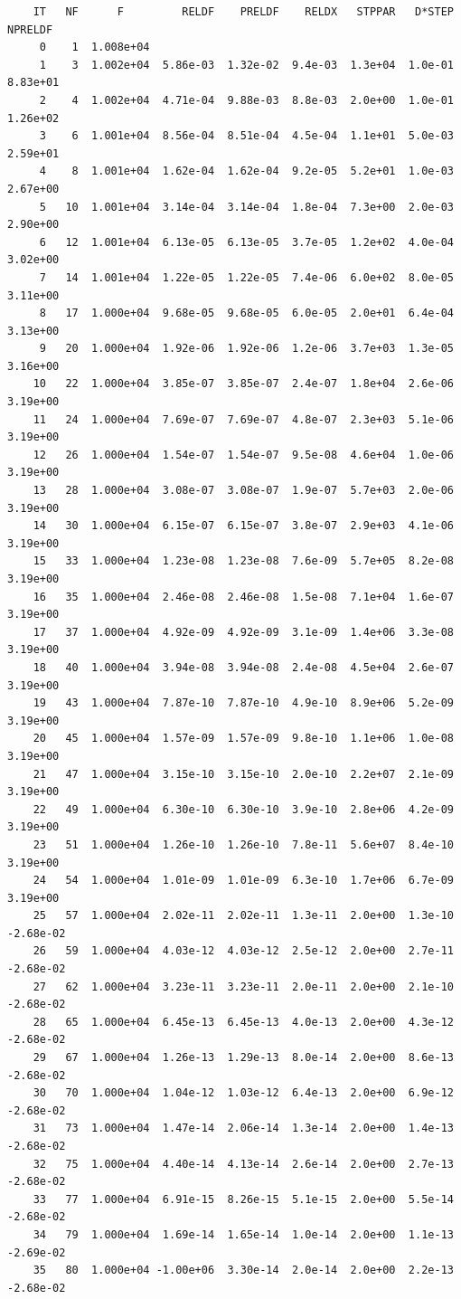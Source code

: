 \documentclass[11pt]{article}\usepackage[]{graphicx}\usepackage[]{color}
\makeatletter
\newenvironment{kframe}{%
 \def\at@end@of@kframe{}%
 \ifinner\ifhmode%
  \def\at@end@of@kframe{\end{minipage}}%
  \begin{minipage}{\columnwidth}%
 \fi\fi%
 \def\FrameCommand##1{\hskip\@totalleftmargin \hskip-\fboxsep
 \colorbox{shadecolor}{##1}\hskip-\fboxsep
     \hskip-\linewidth \hskip-\@totalleftmargin \hskip\columnwidth}%
 \MakeFramed {\advance\hsize-\width
   \@totalleftmargin\z@ \linewidth\hsize
   \@setminipage}}%
 {\par\unskip\endMakeFramed%
 \at@end@of@kframe}
\newenvironment{knitrout}{}{} %
\makeatother
\begin{document}
\begin{knitrout}
\begin{kframe}
\begin{verbatim}
    IT   NF      F         RELDF    PRELDF    RELDX   STPPAR   D*STEP   NPRELDF
     0    1  1.008e+04
     1    3  1.002e+04  5.86e-03  1.32e-02  9.4e-03  1.3e+04  1.0e-01  8.83e+01
     2    4  1.002e+04  4.71e-04  9.88e-03  8.8e-03  2.0e+00  1.0e-01  1.26e+02
     3    6  1.001e+04  8.56e-04  8.51e-04  4.5e-04  1.1e+01  5.0e-03  2.59e+01
     4    8  1.001e+04  1.62e-04  1.62e-04  9.2e-05  5.2e+01  1.0e-03  2.67e+00
     5   10  1.001e+04  3.14e-04  3.14e-04  1.8e-04  7.3e+00  2.0e-03  2.90e+00
     6   12  1.001e+04  6.13e-05  6.13e-05  3.7e-05  1.2e+02  4.0e-04  3.02e+00
     7   14  1.001e+04  1.22e-05  1.22e-05  7.4e-06  6.0e+02  8.0e-05  3.11e+00
     8   17  1.000e+04  9.68e-05  9.68e-05  6.0e-05  2.0e+01  6.4e-04  3.13e+00
     9   20  1.000e+04  1.92e-06  1.92e-06  1.2e-06  3.7e+03  1.3e-05  3.16e+00
    10   22  1.000e+04  3.85e-07  3.85e-07  2.4e-07  1.8e+04  2.6e-06  3.19e+00
    11   24  1.000e+04  7.69e-07  7.69e-07  4.8e-07  2.3e+03  5.1e-06  3.19e+00
    12   26  1.000e+04  1.54e-07  1.54e-07  9.5e-08  4.6e+04  1.0e-06  3.19e+00
    13   28  1.000e+04  3.08e-07  3.08e-07  1.9e-07  5.7e+03  2.0e-06  3.19e+00
    14   30  1.000e+04  6.15e-07  6.15e-07  3.8e-07  2.9e+03  4.1e-06  3.19e+00
    15   33  1.000e+04  1.23e-08  1.23e-08  7.6e-09  5.7e+05  8.2e-08  3.19e+00
    16   35  1.000e+04  2.46e-08  2.46e-08  1.5e-08  7.1e+04  1.6e-07  3.19e+00
    17   37  1.000e+04  4.92e-09  4.92e-09  3.1e-09  1.4e+06  3.3e-08  3.19e+00
    18   40  1.000e+04  3.94e-08  3.94e-08  2.4e-08  4.5e+04  2.6e-07  3.19e+00
    19   43  1.000e+04  7.87e-10  7.87e-10  4.9e-10  8.9e+06  5.2e-09  3.19e+00
    20   45  1.000e+04  1.57e-09  1.57e-09  9.8e-10  1.1e+06  1.0e-08  3.19e+00
    21   47  1.000e+04  3.15e-10  3.15e-10  2.0e-10  2.2e+07  2.1e-09  3.19e+00
    22   49  1.000e+04  6.30e-10  6.30e-10  3.9e-10  2.8e+06  4.2e-09  3.19e+00
    23   51  1.000e+04  1.26e-10  1.26e-10  7.8e-11  5.6e+07  8.4e-10  3.19e+00
    24   54  1.000e+04  1.01e-09  1.01e-09  6.3e-10  1.7e+06  6.7e-09  3.19e+00
    25   57  1.000e+04  2.02e-11  2.02e-11  1.3e-11  2.0e+00  1.3e-10 -2.68e-02
    26   59  1.000e+04  4.03e-12  4.03e-12  2.5e-12  2.0e+00  2.7e-11 -2.68e-02
    27   62  1.000e+04  3.23e-11  3.23e-11  2.0e-11  2.0e+00  2.1e-10 -2.68e-02
    28   65  1.000e+04  6.45e-13  6.45e-13  4.0e-13  2.0e+00  4.3e-12 -2.68e-02
    29   67  1.000e+04  1.26e-13  1.29e-13  8.0e-14  2.0e+00  8.6e-13 -2.68e-02
    30   70  1.000e+04  1.04e-12  1.03e-12  6.4e-13  2.0e+00  6.9e-12 -2.68e-02
    31   73  1.000e+04  1.47e-14  2.06e-14  1.3e-14  2.0e+00  1.4e-13 -2.68e-02
    32   75  1.000e+04  4.40e-14  4.13e-14  2.6e-14  2.0e+00  2.7e-13 -2.68e-02
    33   77  1.000e+04  6.91e-15  8.26e-15  5.1e-15  2.0e+00  5.5e-14 -2.68e-02
    34   79  1.000e+04  1.69e-14  1.65e-14  1.0e-14  2.0e+00  1.1e-13 -2.69e-02
    35   80  1.000e+04 -1.00e+06  3.30e-14  2.0e-14  2.0e+00  2.2e-13 -2.68e-02


\end{verbatim}
\end{kframe}
\end{knitrout}
\end{document}
